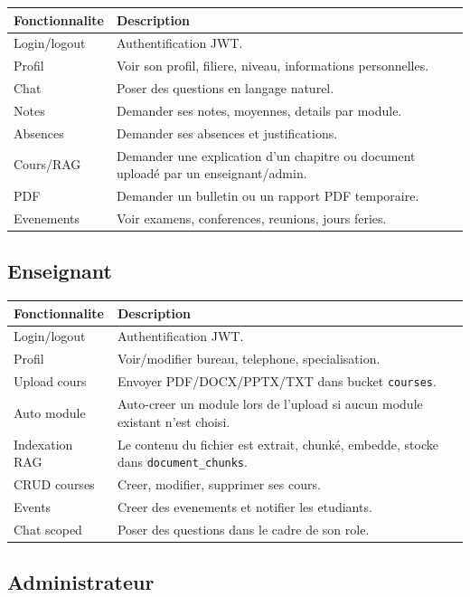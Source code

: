 \documentclass[11pt,a4paper]{article}
\begin{document}
\begin{longtable}{p{5cm}p{9cm}}
\toprule
\textbf{Fonctionnalite} & \textbf{Description}\\
\midrule
Login/logout & Authentification JWT.\\
Profil & Voir son profil, filiere, niveau, informations personnelles.\\
Chat & Poser des questions en langage naturel.\\
Notes & Demander ses notes, moyennes, details par module.\\
Absences & Demander ses absences et justifications.\\
Cours/RAG & Demander une explication d'un chapitre ou document uploadé par un enseignant/admin.\\
PDF & Demander un bulletin ou un rapport PDF temporaire.\\
Evenements & Voir examens, conferences, reunions, jours feries.\\
\bottomrule
\end{longtable}

\subsection{Enseignant}

\begin{longtable}{p{5cm}p{9cm}}
\toprule
\textbf{Fonctionnalite} & \textbf{Description}\\
\midrule
Login/logout & Authentification JWT.\\
Profil & Voir/modifier bureau, telephone, specialisation.\\
Upload cours & Envoyer PDF/DOCX/PPTX/TXT dans bucket \texttt{courses}.\\
Auto module & Auto-creer un module lors de l'upload si aucun module existant n'est choisi.\\
Indexation RAG & Le contenu du fichier est extrait, chunké, embedde, stocke dans \texttt{document\_chunks}.\\
CRUD courses & Creer, modifier, supprimer ses cours.\\
Events & Creer des evenements et notifier les etudiants.\\
Chat scoped & Poser des questions dans le cadre de son role.\\
\bottomrule
\end{longtable}

\subsection{Administrateur}
\end{document}
